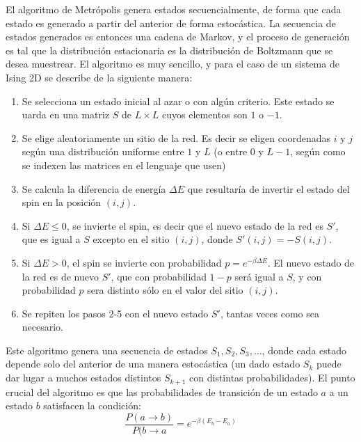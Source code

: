 \documentclass[a4paper,11pt,oneside]{article}
\begin{document}
El algoritmo de Metrópolis genera estados secuencialmente, de forma que cada
estado es generado a partir del anterior de forma estocástica. La secuencia de
estados generados es entonces una cadena de Markov, y el proceso de generación
es tal que la distribución estacionaria es la distribución de Boltzmann que se
desea muestrear. El algoritmo es muy sencillo, y para el caso de un sistema de
Ising 2D se describe de la siguiente manera:
\begin{enumerate}
\item Se selecciona un estado inicial al azar o con algún criterio. Este estado
    se uarda en una matriz $S$ de $L\times L$ cuyos elementos son $1$ o $-1$.
\item Se elige aleatoriamente un sitio de la red. Es decir se eligen
    coordenadas $i$ y $j$ según una distribución uniforme entre $1$ y $L$ (o
    entre $0$ y $L-1$, según como se indexen las matrices en el lenguaje que
    usen)
\item Se calcula la diferencia de energía $\Delta E$ que resultaría de invertir
    el estado del spin en la posición $(i,j)$.
\item Si $\Delta E \leq 0$, se invierte el spin, es decir que el nuevo estado
    de la red es $S'$, que es igual a $S$ excepto en el sitio $(i,j)$,
    donde $S'(i,j) = -S(i,j)$.
\item Si $\Delta E >0$, el spin se invierte con probabilidad $p = e^{-\beta\Delta
    E}$. El nuevo estado de la red es de nuevo $S'$, que con probabilidad
    $1-p$ será igual a $S$, y con probabilidad $p$ sera distinto sólo en el
    valor del sitio $(i,j)$.
\item Se repiten los pasos 2-5 con el nuevo estado $S'$, tantas veces como sea
    necesario.
\end{enumerate}
Este algoritmo genera una secuencia de estados $S_1,S_2,S_3,\dots$, donde cada
estado depende solo del anterior de una manera estocástica (un dado estado
$S_k$ puede dar lugar a muchos estados distintos $S_{k+1}$ con distintas probabilidades).
El punto crucial del algoritmo es que las probabilidades de transición de un
estado $a$ a un estado $b$ satisfacen la condición:
\begin{equation}
    \frac{P(a\to b)}{P(b\to a} = e^{-\beta(E_b-E_a)}
    \label{eq:bal_detallado}
\end{equation}
\end{document}
